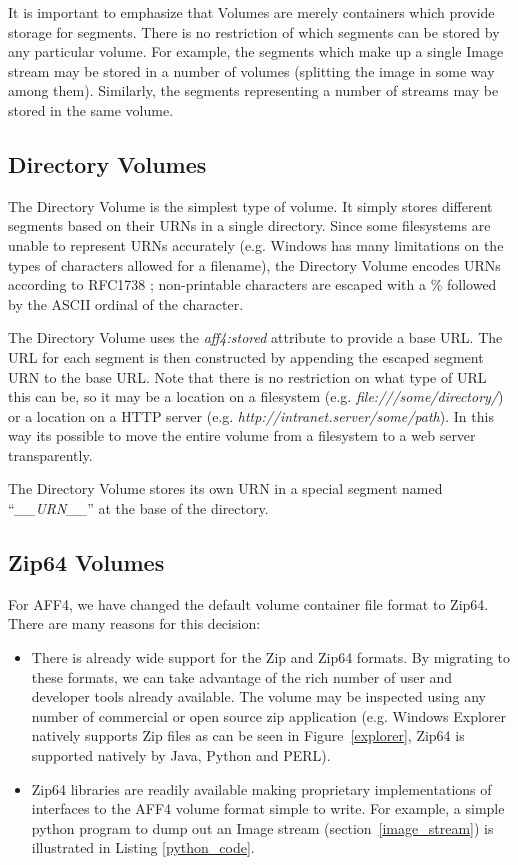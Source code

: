 \documentclass[10pt, conference]{IEEEtran}
\begin{document}
It is important to emphasize that Volumes are merely containers which
provide storage for segments. There is no restriction of which
segments can be stored by any particular volume. For example, the
segments which make up a single Image stream may be stored in a number
of volumes (splitting the image in some way among them). Similarly,
the segments representing a number of streams may be stored in the
same volume.

\subsection{Directory Volumes}
The Directory Volume is the simplest type of volume. It simply stores
different segments based on their URNs in a single directory. Since
some filesystems are unable to represent URNs accurately (e.g. Windows
has many limitations on the types of characters allowed for a
filename), the Directory Volume encodes URNs according to RFC1738
\cite{RFC1738}; non-printable characters are escaped with a \%
followed by the ASCII ordinal of the character.

The Directory Volume uses the {\em aff4:stored} attribute to provide a
base URL. The URL for each segment is then constructed by appending
the escaped segment URN to the base URL. Note that there is no
restriction on what type of URL this can be, so it may be a location
on a filesystem (e.g. {\em file:///some/directory/}) or a location on a
HTTP server (e.g. {\em http://intranet.server/some/path}). In this
way its possible to move the entire volume from a filesystem to a web
server transparently.

The Directory Volume stores its own URN in a special segment named
``{\em \_\_URN\_\_}'' at the base of the directory.

\subsection{Zip64 Volumes}
For AFF4, we have changed the default volume container file format to
Zip64\cite{zip-format}. There are many reasons for this decision:

\begin{itemize}
\item There is already wide support for the Zip and Zip64 formats. By
  migrating to these formats, we can take advantage of the rich number
  of user and developer tools already available. The volume may be
  inspected using any number of commercial or open source zip
  application (e.g. Windows Explorer natively supports Zip files as
  can be seen in Figure~\ref{explorer}, Zip64 is supported natively
  by Java, Python and PERL).
 
\item Zip64 libraries are readily available making proprietary implementations of
  interfaces to the AFF4 volume format simple to write. For example, a
  simple python program to dump out an Image stream
  (section~\ref{image_stream}) is illustrated in Listing
  \ref{python_code}.

\end{itemize}
\end{document}
